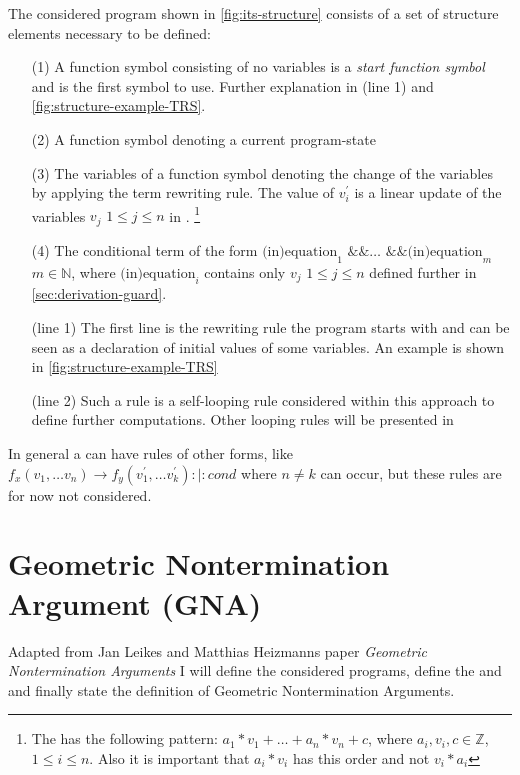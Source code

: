 The considered program shown in \autoref{fig:its-structure} consists of a set of structure elements necessary to be defined:
\begin{enumerate}[leftmargin=1]
	\item[(1)] A function symbol consisting of no variables is a \textit{start function symbol} and is the first symbol to use. Further explanation in (line 1) and \autoref{fig:structure-example-TRS}.
	\item[(2)] A function symbol denoting a current program-state
	\item[(3)] The variables of a function symbol denoting the change of the variables by applying the term rewriting rule. The value of $v^\prime_i$ is a linear update of the variables $v_j$ $1 \le j \le n$ in \stdLinInt. \footnote{The \stdLinInt has the following pattern: $ a_1*v_1 + \dots + a_n*v_n + c$, where $a_i , v_i, c \in \mathbb{Z}$, $1 \le i\le n$. 
		Also it is important that $a_i * v_i$ has this order and not $v_i*a_i$} 
	\item[(4)] The conditional term of the form $\text{(in)equation}_1 \text{ \&\& } \dots \text{ \&\& } \text{(in)equation}_m$ $m \in \mathbb{N}$, where $\text{(in)equation}_i$ contains only $v_j$ $1 \le j \le n$ defined further in \autoref{sec:derivation-guard}.
	\item[(line 1)] The first line is the rewriting rule the program starts with and can be seen as a declaration of initial values of some variables. An example is shown in \autoref{fig:structure-example-TRS}
	\item[(line 2)] Such a rule is a self-looping rule considered within this approach to define further computations. Other looping rules will be presented in %
\end{enumerate} 

In general a \its can have rules of other forms, like $f_x(v_1, \dots v_n) \rightarrow f_y(v^\prime_1, \dots v^\prime_k) :|: cond$ where $n \ne k$ can occur, but these rules are for now not considered.

\section{Geometric Nontermination Argument (GNA)}
Adapted from Jan Leikes and Matthias Heizmanns paper \textit{Geometric Nontermination Arguments} \cite{leike2014geometric} I will define the considered programs, define the \stem and \loopt and finally state the definition of Geometric Nontermination Arguments.

